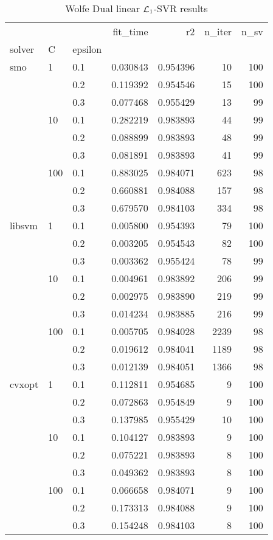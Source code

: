 \begin{table}[H]
\centering
\caption{Wolfe Dual linear $\protect \mathcal{L}_1$-SVR results}
\label{linear_dual_l1_svr_cv_results}
\begin{tabular}{lllrrrr}
\toprule
       &     &     &  fit\_time &        r2 &  n\_iter &  n\_sv \\
solver & C & epsilon &           &           &         &       \\
\midrule
smo & 1   & 0.1 &  0.030843 &  0.954396 &      10 &   100 \\
       &     & 0.2 &  0.119392 &  0.954546 &      15 &   100 \\
       &     & 0.3 &  0.077468 &  0.955429 &      13 &    99 \\
       & 10  & 0.1 &  0.282219 &  0.983893 &      44 &    99 \\
       &     & 0.2 &  0.088899 &  0.983893 &      48 &    99 \\
       &     & 0.3 &  0.081891 &  0.983893 &      41 &    99 \\
       & 100 & 0.1 &  0.883025 &  0.984071 &     623 &    98 \\
       &     & 0.2 &  0.660881 &  0.984088 &     157 &    98 \\
       &     & 0.3 &  0.679570 &  0.984103 &     334 &    98 \\
libsvm & 1   & 0.1 &  0.005800 &  0.954393 &      79 &   100 \\
       &     & 0.2 &  0.003205 &  0.954543 &      82 &   100 \\
       &     & 0.3 &  0.003362 &  0.955424 &      78 &    99 \\
       & 10  & 0.1 &  0.004961 &  0.983892 &     206 &    99 \\
       &     & 0.2 &  0.002975 &  0.983890 &     219 &    99 \\
       &     & 0.3 &  0.014234 &  0.983885 &     216 &    99 \\
       & 100 & 0.1 &  0.005705 &  0.984028 &    2239 &    98 \\
       &     & 0.2 &  0.019612 &  0.984041 &    1189 &    98 \\
       &     & 0.3 &  0.012139 &  0.984051 &    1366 &    98 \\
cvxopt & 1   & 0.1 &  0.112811 &  0.954685 &       9 &   100 \\
       &     & 0.2 &  0.072863 &  0.954849 &       9 &   100 \\
       &     & 0.3 &  0.137985 &  0.955429 &      10 &   100 \\
       & 10  & 0.1 &  0.104127 &  0.983893 &       9 &   100 \\
       &     & 0.2 &  0.075221 &  0.983893 &       8 &   100 \\
       &     & 0.3 &  0.049362 &  0.983893 &       8 &   100 \\
       & 100 & 0.1 &  0.066658 &  0.984071 &       9 &   100 \\
       &     & 0.2 &  0.173313 &  0.984088 &       9 &   100 \\
       &     & 0.3 &  0.154248 &  0.984103 &       8 &   100 \\
\bottomrule
\end{tabular}
\end{table}
